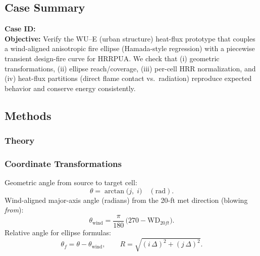 \documentclass[../report/case_report.tex]{subfiles}
\begin{document}
\subsection*{Case Summary}
\textbf{Case ID:} \CaseID\\
\textbf{Objective:} Verify the WU--E (urban structure) heat-flux prototype that couples a wind-aligned anisotropic fire ellipse (Hamada-style regression) with a piecewise transient design-fire curve for HRRPUA. We check that (i) geometric transformations, (ii) ellipse reach/coverage, (iii) per-cell HRR normalization, and (iv) heat-flux partitions (direct flame contact vs.\ radiation) reproduce expected behavior and conserve energy consistently.

\subsection{Methods}
\subsubsection{Theory}
\subsubsection*{Coordinate Transformations}
Geometric angle from source to target cell:
\begin{equation}
  \theta=\arctan\!\big(j,\; i\big)\quad (\mathrm{rad}).
\end{equation}
Wind-aligned major-axis angle (radians) from the 20-ft met direction (blowing \emph{from}):
\begin{equation}
  \theta_{\mathrm{wind}}=\frac{\pi}{180}\,\big(270-\mathrm{WD}_{20ft}\big).
\end{equation}
Relative angle for ellipse formulas:
\begin{equation}
  \theta_f=\theta-\theta_{\mathrm{wind}}, \qquad
  R=\sqrt{(i\,\Delta)^2+(j\,\Delta)^2}.
\end{equation}
\end{document}
